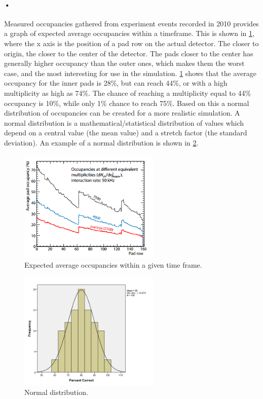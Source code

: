 \documentclass[a4paper, 12pt]{report}
\begin{document}
\paragraph{•}
Measured occupancies gathered from experiment events recorded in 2010 provides a graph of expected average occupancies within a timeframe.
This is shown in \ref{fig:expected-occupancy}, where the x axis is the position of a pad row on the actual detector.
The closer to origin, the closer to the center of the detector.
The pads closer to the center has generally higher occupancy than the outer ones, which makes them the worst case, and the most interesting for use in the simulation.
\ref{fig:expected-occupancy} shows that the average occupancy for the inner pads is 28\%, but can reach 44\%, or with a high multiplicity as high as 74\%.
The chance of reaching a multiplicity equal to 44\% occupancy is 10\%, while only 1\% chance to reach 75\%.
Based on this a normal distribution of occupancies can be created for a more realistic simulation.
A normal distribution is a mathematical/statistical distribution of values which depend on a central value (the mean value) and a stretch factor (the standard deviation)\cite{normal-dist}.
An example of a normal distribution is shown in \ref{fig:normal-dist}.

\begin{figure}[h!]
	\centering
		\includegraphics[width=0.6\textwidth]{images/expected-occupancy.png}
		\caption{Expected average occupancies within a given time frame. \cite{tdr-016}}
		\label{fig:expected-occupancy}
\end{figure}


\begin{figure}[h!]
	\centering
		\includegraphics[width=0.6\textwidth]{images/normal-dist.png}
		\caption{Normal distribution. \cite{normal-dist-image}}
		\label{fig:normal-dist}
\end{figure}
\end{document}
